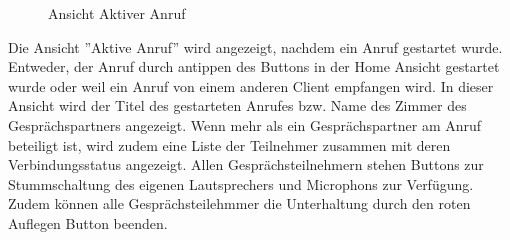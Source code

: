 \begin{figure}[h]
\begin{minipage}[b]{0.4\textwidth}
        \caption{Ansicht Aktiver Anruf}
    \end{minipage}
    \label{fig:MobileClient-Screens3}
\end{figure}

Die Ansicht ''Aktive Anruf'' wird angezeigt, nachdem ein Anruf gestartet wurde.
Entweder, der Anruf durch antippen des Buttons in der Home Ansicht gestartet wurde oder weil ein Anruf von einem anderen Client empfangen wird.
In dieser Ansicht wird der Titel des gestarteten Anrufes bzw. Name des Zimmer des Gesprächspartners angezeigt.
Wenn mehr als ein Gesprächspartner am Anruf beteiligt ist, wird zudem eine Liste der Teilnehmer zusammen mit deren Verbindungsstatus angezeigt.
Allen Gesprächsteilnehmern stehen Buttons zur Stummschaltung des eigenen Lautsprechers und Microphons zur Verfügung.
Zudem können alle Gesprächsteilehmmer die Unterhaltung durch den roten Auflegen Button beenden.

